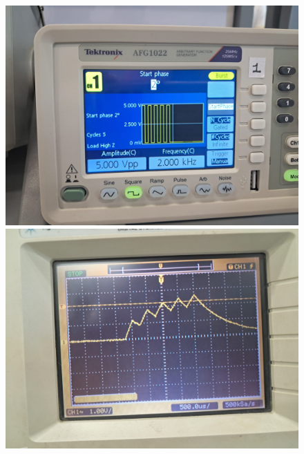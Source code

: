 \documentclass[a4paper,12pt]{article}
\begin{document}
\begin{figure}[h]
    \centering
    \begin{minipage}{0.45\textwidth}
        \centering
        \includegraphics[width=\textwidth]{figs/T2kpara.jpeg}
    \end{minipage}\hfill
    \begin{minipage}{0.45\textwidth}
        \centering
        \includegraphics[width=\textwidth]{figs/T2kplot.jpeg}
    \end{minipage}
\end{figure}
\end{document}

